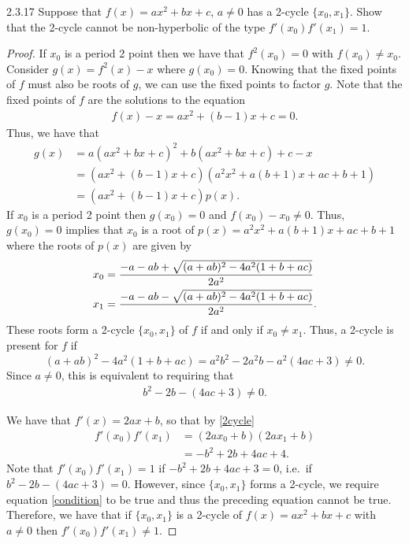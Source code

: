 \begin{problem}{2.3.17}
  Suppose that $f(x) = ax^2 + bx + c$, $a\neq 0$ has a 2-cycle $\{x_0, x_1\}$.
  Show that the 2-cycle cannot be non-hyperbolic of the type $f'(x_0)f'(x_1) = 1$.
\end{problem}

\begin{proof}
  If $x_0$ is a period 2 point then we have that $f^2(x_0) = 0$ with $f(x_0) \neq x_0$.
  Consider $g(x) = f^2(x) - x$ where $g(x_0) = 0$. Knowing that the fixed points of
  $f$ must also be roots of $g$, we can use the fixed points to factor $g$.
  Note that the fixed points of $f$ are the solutions to the equation
  \begin{align*}
    f(x)-x = ax^2 + (b-1)x + c = 0.
  \end{align*}
  Thus, we have that
  \begin{align*}
    g(x) &= a(ax^2 + bx+ c)^2 + b(ax^2 + bx+ c) + c -x \\
    &= (ax^2 + (b-1)x+ c)(a^2 x^2 + a(b + 1) x  + a c + b + 1 ) \\
    &= (ax^2 + (b-1)x+ c) p(x).
  \end{align*}
  If $x_0$ is a period 2 point then $g(x_0) =0$ and $f(x_0) - x_0 \neq 0$. Thus, $g(x_0)=0$
  implies that $x_0$ is a root of $p(x) = a^2 x^2 + a(b + 1) x  + a c + b + 1$ where the roots of $p(x)$
  are given by
  \begin{align}\label{2cycle}
    x_0 &= \frac{-a - a b + \sqrt{(a + a b)^2 - 4 a^2 (1 + b + a c)}}{2 a^2} \notag \\
    x_1 &= \frac{-a - a b - \sqrt{(a + a b)^2 - 4 a^2 (1 + b + a c)}}{2 a^2}.
  \end{align}
  These roots form a 2-cycle $\{x_0, x_1\}$ of $f$ if and only if $x_0 \neq x_1$. Thus,
  a 2-cycle is present for $f$ if
  $$(a + a b)^2 - 4 a^2 (1 + b + a c) = a^2 b^2 - 2 a^2 b - a^2(4 a c +3)   \neq 0.$$
  Since $a\neq 0$, this is equivalent to requiring that
  \begin{align}\label{condition}
    b^2 - 2b - (4 a c +3)   \neq 0.
  \end{align}

  We have that $f'(x) = 2 a x + b$, so that by \eqref{2cycle}
  \begin{align*}
    f'(x_0) f'(x_1)
    &= (2a x_0 +b) (2a x_1 + b) \\
    &= -b^2 + 2b +4ac + 4.
  \end{align*}
  Note that $f'(x_0)f'(x_1) = 1$ if $-b^2 + 2b +4ac + 3 = 0$, i.e.\ if $b^2 - 2b -(4ac + 3) = 0$.
  However, since $\{x_0, x_1\}$ forms a 2-cycle, we require equation \eqref{condition} to be true and thus the
  preceding equation cannot be true. Therefore,
  we have that if $\{x_0, x_1\}$ is a 2-cycle of $f(x) = ax^2 +bx + c$ with $a\neq 0$ then $f'(x_0)f'(x_1) \neq 1$.

\end{proof}
\newpage
